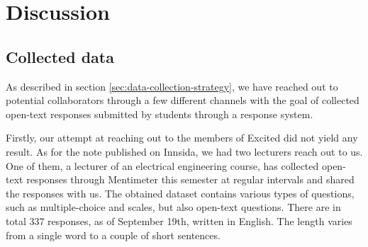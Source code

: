 \chapter{Discussion}\label{chap:discussion}

\section{Collected data}

As described in section \ref{sec:data-collection-strategy}, we have reached out to potential collaborators through a few different channels with the goal of collected open-text responses submitted by students through a response system.

Firstly, our attempt at reaching out to the members of Excited did not yield any result. As for the note published on Innsida, we had two lecturers reach out to us. One of them, a lecturer of an electrical engineering course, has collected open-text responses through Mentimeter this semester at regular intervals and shared the responses with us. The obtained dataset contains various types of questions, such as multiple-choice and scales, but also open-text questions. There are in total 337 responses, as of September 19th, written in English. The length varies from a single word to a couple of short sentences.


